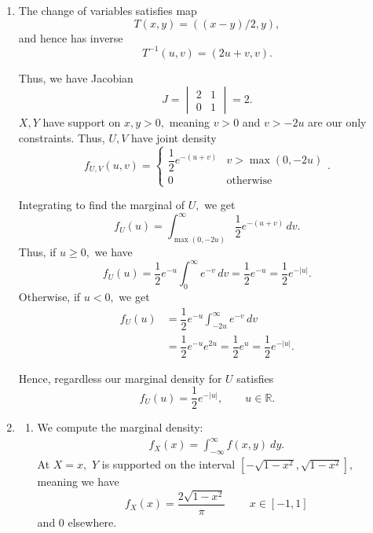 \documentclass[12pt]{article}
\begin{document}
\begin{enumerate}
  \item The change of variables satisfies map
    $$
    T(x, y) = ((x-y)/ 2, y),
    $$
    and hence has inverse
    $$
    T^{-1}(u, v) = (2u + v, v).
    $$

    Thus, we have Jacobian
    $$
    J =
    \begin{vmatrix}
      2 & 1 \\
      0 & 1
    \end{vmatrix} = 2.
    $$
    $X, Y$ have support on $x, y > 0,$ meaning $v > 0$ and $v > - 2u$
    are our only constraints. Thus, $U, V$ have joint density
    $$
    f_{U, V}(u, v) =
    \begin{cases}
      \dfrac{1}{2} e^{-(u + v)} & v> \max(0, -2u)  \\
      0 & \text{otherwise}
    \end{cases}.
    $$

    Integrating to find the marginal of $U,$ we get
    $$
    f_U(u) = \int_{\max(0, -2u)}^{\infty} \dfrac{1}{2} e^{-(u + v)} \, dv.
    $$
    Thus, if $u \geq 0,$ we have
    $$
    f_U(u) = \dfrac{1}{2}e^{-u}\int_{0}^{\infty} e^{-v} \, dv =
    \dfrac{1}{2}e^{-u} = \dfrac{1}{2}e^{-|u|}.
    $$
    Otherwise, if $u < 0,$ we get
    \begin{align*}
      f_U(u) &= \dfrac{1}{2}e^{-u}\int_{-2u}^{\infty}  e^{-v} \, dv \\
      &= \dfrac{1}{2}e^{-u} e^{2u} = \dfrac{1}{2} e^{u} = \dfrac{1}{2}e^{-|u|}.
    \end{align*}

    Hence, regardless our marginal density for $U$ satisfies
    $$
    f_U(u) = \dfrac{1}{2}e^{-|u|}, \qquad u \in \mathbb R.
    $$

  \item
    \begin{enumerate}

      \item We compute the marginal density:
        \begin{align*}
          f_X(x)= \int_{-\infty}^{\infty} f(x, y)\  dy.
        \end{align*}
        At $X = x,$ $Y$ is supported on the interval $[-\sqrt{1-x^2},
        \sqrt{1-x^2}],$ meaning we have
        $$
        f_X(x) = \dfrac{2\sqrt{1-x^2}}{\pi}\, \qquad x \in [-1, 1]
        $$
        and $0$ elsewhere.

        \begin{figure}[h]
          \centering
\end{figure}
\end{enumerate}
\end{enumerate}
\end{document}
